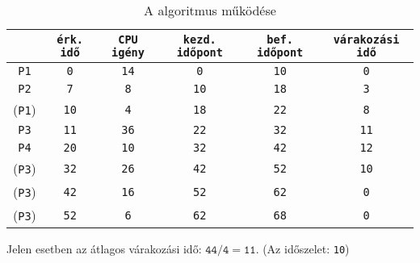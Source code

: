 \documentclass[../main.tex]{subfiles}
\begin{document}
\begin{table}[H]
  \centering
  \begin{tabular}{|c|c|c|c|c|c|}
    \hline
                  & \texttt{érk. idő} & \texttt{CPU igény} & \texttt{kezd. időpont} & \texttt{bef. időpont} & \texttt{várakozási idő}
    \\ \hline
    \texttt{P1}   & \texttt{0}        & \texttt{14}        & \texttt{0}             & \texttt{10}           & \texttt{0}              \\
    \texttt{P2}   & \texttt{7}        & \texttt{8}         & \texttt{10}            & \texttt{18}           & \texttt{3}              \\
    (\texttt{P1}) & \texttt{10}       & \texttt{4}         & \texttt{18}            & \texttt{22}           & \texttt{8}              \\
    \texttt{P3}   & \texttt{11}       & \texttt{36}        & \texttt{22}            & \texttt{32}           & \texttt{11}             \\
    \texttt{P4}   & \texttt{20}       & \texttt{10}        & \texttt{32}            & \texttt{42}           & \texttt{12}             \\
    (\texttt{P3}) & \texttt{32}       & \texttt{26}        & \texttt{42}            & \texttt{52}           & \texttt{10}             \\
    (\texttt{P3}) & \texttt{42}       & \texttt{16}        & \texttt{52}            & \texttt{62}           & \texttt{0}              \\
    (\texttt{P3}) & \texttt{52}       & \texttt{6}         & \texttt{62}            & \texttt{68}           & \texttt{0}              \\
    \hline
  \end{tabular}
  \caption{A  algoritmus működése}
  \label{table:rr}
\end{table}

Jelen esetben az átlagos várakozási idő:
$\mathtt{44/4 = 11}$. (Az időszelet: \texttt{10})
\end{document}
